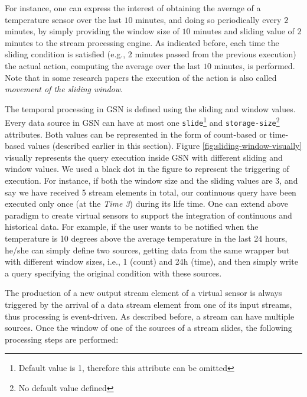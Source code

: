 For instance, one can express the interest
of obtaining the average of a temperature sensor over the last $10$
minutes, and doing so periodically every $2$ minutes, by simply
providing the window size of $10$ minutes and sliding value of $2$
minutes to the stream processing engine. As indicated before, each
time the sliding condition is satisfied (e.g., $2$ minutes passed from
the previous execution) the actual action, computing the average over the last $10$
minutes, is performed. Note that in some research papers the
execution of the action is also called \emph{movement of the sliding
window}. 

The temporal processing in GSN is defined using the sliding and window values. Every data source in
GSN can have at most one \verb|slide|\footnote{Default value is 1, therefore this attribute can be omitted}
and \verb|storage-size|\footnote{No default value defined} attributes. Both values can be represented
in the form of count-based or time-based values (described earlier in this section).
Figure \ref{fig:sliding-window-visually} visually represents the query execution inside GSN with different sliding and window values.
We used a black dot in the figure to represent the triggering of execution. For instance, if both the window size and the sliding 
values are 3, and say we have received 5 stream elements in total, our continuous query have been executed only once (at the \emph{Time 3}) during its life time. 
One can extend above paradigm to create virtual sensors to support the integration of continuous and
historical data. For example, if the user wants to be notified when the temperature is 10 degrees above the average temperature in the
last 24 hours, he/she can simply define two sources, getting data from the same wrapper but with different window sizes, i.e., 1
(count) and 24h (time), and then simply write a query specifying the original condition with these sources.


The production of a new output stream element of a virtual sensor is always triggered
by the arrival of a data stream element from one of its input streams, thus processing is event-driven.
As described before, a stream can have multiple sources. 
Once the window of one of the sources of a stream slides, the 
following processing steps are performed:

